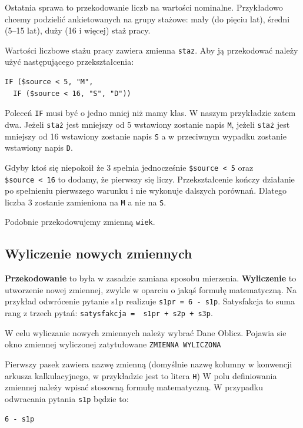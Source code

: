 \documentclass[
  openany]{book}
\begin{document}
Ostatnia sprawa to przekodowanie liczb na wartości nominalne. Przykładowo chcemy podzielić
ankietowanych na grupy stażowe: mały (do pięciu lat), średni (5--15 lat), duży (16 i więcej) staż pracy.

Wartości liczbowe stażu pracy zawiera zmienna \texttt{staz}. Aby ją przekodować
należy użyć następującego przekształcenia:

\begin{verbatim}
IF ($source < 5, "M",
  IF ($source < 16, "S", "D"))
\end{verbatim}

Poleceń \texttt{IF} musi być o jedno mniej niż mamy klas. W naszym przykładzie zatem dwa. Jeżeli
\texttt{staż} jest mniejszy od 5 wstawiony zostanie napis \texttt{M}, jeżeli \texttt{staż} jest mniejszy od 16
wstawiony zostanie napis \texttt{S} a w przeciwnym wypadku zostanie wstawiony napis \texttt{D}.

Gdyby ktoś się niepokoił że 3 spełnia jednocześnie \texttt{\$source\ \textless{}\ 5} oraz \texttt{\$source\ \textless{}\ 16}
to dodamy, że pierwszy się liczy. Przekształcenie kończy działanie po spełnieniu pierwszego warunku i nie
wykonuje dalszych porównań. Dlatego liczba 3 zostanie zamieniona na \texttt{M} a nie na \texttt{S}.

Podobnie przekodowujemy zmienną \texttt{wiek}.

\hypertarget{wyliczenie-nowych-zmiennych}{%
\subsection{Wyliczenie nowych zmiennych}\label{wyliczenie-nowych-zmiennych}}

\textbf{Przekodowanie} to była w zasadzie zamiana sposobu mierzenia. \textbf{Wyliczenie} to utworzenie
nowej zmiennej, zwykle w oparciu o jakąś formułę matematyczną. Na przykład odwrócenie pytanie s1p
realizuje \texttt{s1pr\ =\ 6\ -\ s1p}. Satysfakcja to suma rang z trzech pytań:
\texttt{satysfakcja\ =\ \ s1pr\ +\ s2p\ +\ s3p}.

W celu wyliczanie nowych zmiennych należy wybrać Dane Oblicz. Pojawia sie okno
zmiennej wyliczonej zatytułowane \texttt{ZMIENNA\ WYLICZONA}

Pierwszy pasek zawiera nazwę zmienną (domyślnie nazwę kolumny w konwencji arkusza kalkulacyjnego, w przykładzie
jest to litera \texttt{H}) W polu definiowania zmiennej należy wpisać
stosowną formułę matematyczną. W przypadku odwracania pytania \texttt{s1p} będzie to:

\begin{verbatim}
6 - s1p
\end{verbatim}
\end{document}
